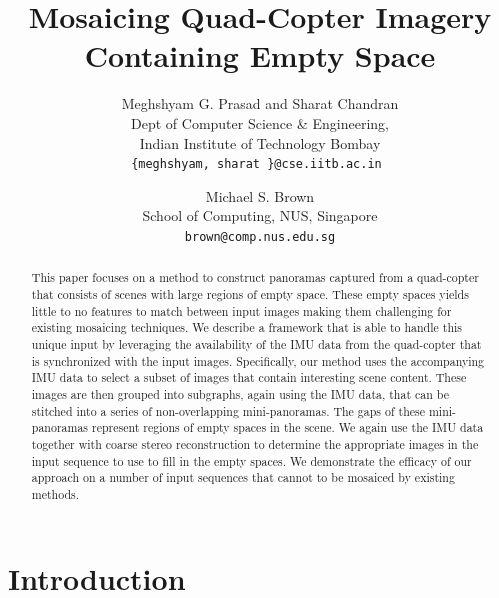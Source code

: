 \documentclass[10pt,twocolumn,letterpaper]{article}
\begin{document}
\title{Mosaicing Quad-Copter Imagery Containing Empty Space}

\author{Meghshyam G. Prasad and Sharat Chandran\\
Dept of Computer Science \& Engineering, \\
Indian Institute of Technology Bombay\\
{\tt\small \{meghshyam, sharat \}@cse.iitb.ac.in }
\and
Michael S. Brown\\
School of Computing, NUS, Singapore\\
{\tt\small brown@comp.nus.edu.sg}
}

\maketitle


\begin{abstract}
This paper focuses on a method to construct panoramas captured from a quad-copter that 
consists of scenes with large regions of empty space.  These empty spaces yields little to no features to match between input images making them challenging for existing mosaicing techniques.  We describe a framework that is able to handle this unique input by leveraging the availability of the IMU data from the quad-copter that is synchronized with the input images.  Specifically, our method uses the accompanying IMU data to select a subset of images that contain interesting scene content.  These images are then grouped into subgraphs, again using the IMU data, that can be stitched into a series of  non-overlapping mini-panoramas.  The gaps of these mini-panoramas represent regions of empty spaces in the scene.  We again use the IMU data together with coarse stereo reconstruction to determine the appropriate images in the input sequence to use to fill in the empty spaces.  We demonstrate the efficacy of our approach on a number of input sequences that cannot to be mosaiced by existing methods.
\end{abstract}

\section{Introduction}
\end{document}
